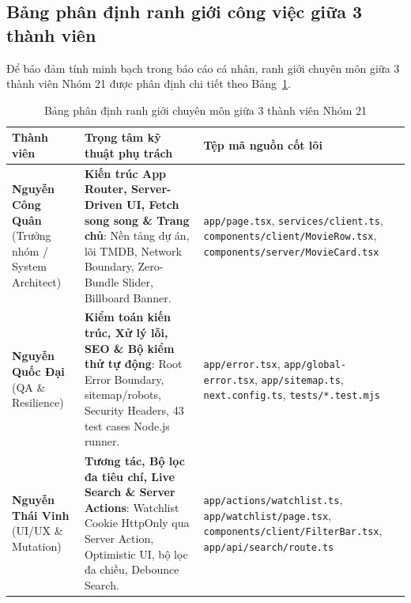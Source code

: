 \documentclass[12pt,a4paper]{extarticle}
\begin{document}
\subsection{Bảng phân định ranh giới công việc giữa 3 thành viên}
Để bảo đảm tính minh bạch trong báo cáo cá nhân, ranh giới chuyên môn giữa 3 thành viên Nhóm 21 được phân định chi tiết theo Bảng~\ref{tab:phancong}.

\begin{table}[H]
\centering
\caption{Bảng phân định ranh giới chuyên môn giữa 3 thành viên Nhóm 21}
\label{tab:phancong}
\fontsize{9.5}{12.5}\selectfont
\renewcommand{\arraystretch}{1.2}
\begin{tabularx}{\textwidth}{|p{3.2cm}|X|p{4.6cm}|}
\hline
\textbf{Thành viên} & \textbf{Trọng tâm kỹ thuật phụ trách} & \textbf{Tệp mã nguồn cốt lõi} \\
\hline
\textbf{Nguyễn Công Quân} \newline (Trưởng nhóm / \newline System Architect) & \textbf{Kiến trúc App Router, Server-Driven UI, Fetch song song \& Trang chủ}: Nền tảng dự án, lõi TMDB, Network Boundary, Zero-Bundle Slider, Billboard Banner. & \texttt{app/page.tsx}, \newline \texttt{services/client.ts}, \newline \nolinkurl{components/client/MovieRow.tsx}, \newline \nolinkurl{components/server/MovieCard.tsx} \\
\hline
\textbf{Nguyễn Quốc Đại} \newline (QA \& Resilience) & \textbf{Kiểm toán kiến trúc, Xử lý lỗi, SEO \& Bộ kiểm thử tự động}: Root Error Boundary, sitemap/robots, Security Headers, 43 test cases Node.js runner. & \texttt{app/error.tsx}, \texttt{app/global-error.tsx}, \newline \texttt{app/sitemap.ts}, \texttt{next.config.ts}, \newline \nolinkurl{tests/*.test.mjs} \\
\hline
\textbf{Nguyễn Thái Vinh} \newline (UI/UX \& Mutation) & \textbf{Tương tác, Bộ lọc đa tiêu chí, Live Search \& Server Actions}: Watchlist Cookie HttpOnly qua Server Action, Optimistic UI, bộ lọc đa chiều, Debounce Search. & \nolinkurl{app/actions/watchlist.ts}, \newline \texttt{app/watchlist/page.tsx}, \newline \nolinkurl{components/client/FilterBar.tsx}, \newline \nolinkurl{app/api/search/route.ts} \\
\hline
\end{tabularx}
\end{table}
\end{document}
